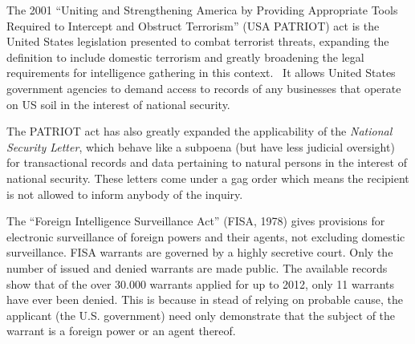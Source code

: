 \documentclass[12pt]{article}
\begin{document}
The 2001 ``Uniting and Strengthening America by Providing Appropriate Tools Required to Intercept and Obstruct Terrorism'' (USA PATRIOT) act is the United States legislation presented to combat terrorist threats, expanding the definition to include domestic terrorism and greatly broadening the legal requirements for intelligence gathering in this context.~\cite{mailman2002uniting} 
It allows United States government agencies to demand access to records of any businesses that operate on US soil in the interest of national security.

The PATRIOT act has also greatly expanded the applicability of the \textit{National Security Letter}, which behave like a subpoena (but have less judicial oversight) for transactional records and data pertaining to natural persons in the interest of national security.
These letters come under a gag order which means the recipient is not allowed to inform anybody of the inquiry.

The ``Foreign Intelligence Surveillance Act'' (FISA, 1978) gives provisions for electronic surveillance of foreign powers and their agents, not excluding domestic surveillance.
FISA warrants are governed by a highly secretive court. Only the number of issued and denied warrants are made public.
The available records show that of the over 30.000 warrants applied for up to 2012, only 11 warrants have ever been denied.
This is because in stead of relying on probable cause, the applicant (the U.S. government) need only demonstrate that the subject of the warrant is a foreign power or an agent thereof.


\end{document}
